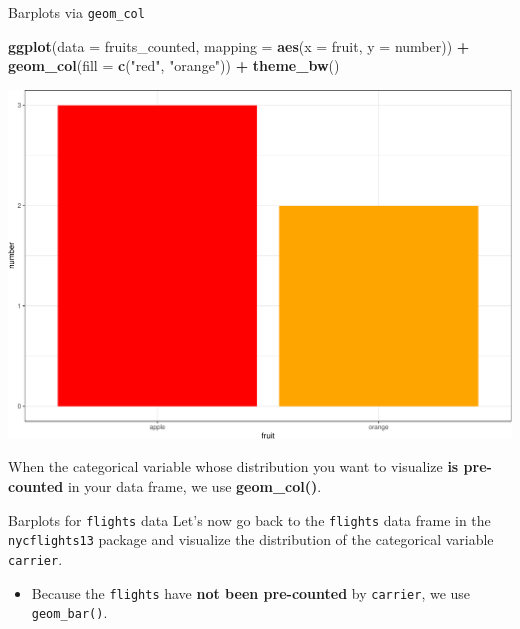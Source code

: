 \documentclass[
  ignorenonframetext,
]{beamer}
\newenvironment{Shaded}{\begin{snugshade}}{\end{snugshade}}
\newcommand{\AttributeTok}[1]{\textcolor[rgb]{0.13,0.29,0.53}{#1}}
\newcommand{\FunctionTok}[1]{\textcolor[rgb]{0.13,0.29,0.53}{\textbf{#1}}}
\newcommand{\NormalTok}[1]{#1}
\newcommand{\SpecialCharTok}[1]{\textcolor[rgb]{0.81,0.36,0.00}{\textbf{#1}}}
\newcommand{\StringTok}[1]{\textcolor[rgb]{0.31,0.60,0.02}{#1}}
\providecommand{\tightlist}{%
  \setlength{\itemsep}{0pt}\setlength{\parskip}{0pt}}
\begin{document}
\begin{frame}[fragile]{Barplots via \texttt{geom\_col}}
\protect\hypertarget{barplots-via-geom_col}{}
\tiny

\begin{Shaded}
\begin{Highlighting}[]
\FunctionTok{ggplot}\NormalTok{(}\AttributeTok{data =}\NormalTok{ fruits\_counted, }\AttributeTok{mapping =} \FunctionTok{aes}\NormalTok{(}\AttributeTok{x =}\NormalTok{ fruit, }\AttributeTok{y =}\NormalTok{ number)) }\SpecialCharTok{+}
  \FunctionTok{geom\_col}\NormalTok{(}\AttributeTok{fill =} \FunctionTok{c}\NormalTok{(}\StringTok{"red"}\NormalTok{, }\StringTok{"orange"}\NormalTok{)) }\SpecialCharTok{+} 
  \FunctionTok{theme\_bw}\NormalTok{()}
\end{Highlighting}
\end{Shaded}

\begin{center}\includegraphics[width=0.9\linewidth,height=0.5\textheight]{Week2_Lect_files/figure-beamer/unnamed-chunk-38-1} \end{center}
\normalsize

When the categorical variable whose distribution you want to visualize
\textbf{is pre-counted} in your data frame, we use \textbf{geom\_col()}.
\end{frame}

\begin{frame}[fragile]{Barplots for \texttt{flights} data}
\protect\hypertarget{barplots-for-flights-data}{}
Let's now go back to the \texttt{flights} data frame in the
\texttt{nycflights13} package and visualize the distribution of the
categorical variable \texttt{carrier}.

\begin{itemize}
\tightlist
\item
  Because the \texttt{flights} have \textbf{not been pre-counted} by
  \texttt{carrier}, we use \texttt{geom\_bar()}.
\end{itemize}
\end{frame}
\end{document}
